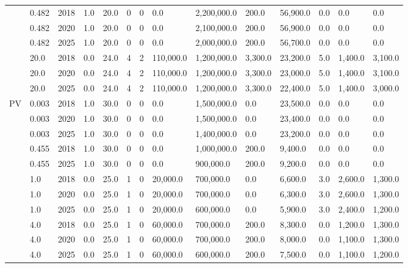 \begin{table*}[]
\begin{tabularx}{\linewidth}{|p{}|l|l|l|l|l|l|l|l|l|l|l|l|l|}
& 0.482 & 2018 & 1.0 & 20.0 & 0 & 0 & 0.0 & 2,200,000.0 & 200.0 & 56,900.0 & 0.0 & 0.0 & 0.0 \\ \cline{2-14} 
& 0.482 & 2020 & 1.0 & 20.0 & 0 & 0 & 0.0 & 2,100,000.0 & 200.0 & 56,900.0 & 0.0 & 0.0 & 0.0 \\ \cline{2-14} 
& 0.482 & 2025 & 1.0 & 20.0 & 0 & 0 & 0.0 & 2,000,000.0 & 200.0 & 56,700.0 & 0.0 & 0.0 & 0.0 \\ \cline{2-14} 
& 20.0 & 2018 & 0.0 & 24.0 & 4 & 2 & 110,000.0 & 1,200,000.0 & 3,300.0 & 23,200.0 & 5.0 & 1,400.0 & 3,100.0 \\ \cline{2-14} 
& 20.0 & 2020 & 0.0 & 24.0 & 4 & 2 & 110,000.0 & 1,200,000.0 & 3,300.0 & 23,000.0 & 5.0 & 1,400.0 & 3,100.0 \\ \cline{2-14} 
& 20.0 & 2025 & 0.0 & 24.0 & 4 & 2 & 110,000.0 & 1,200,000.0 & 3,300.0 & 22,400.0 & 5.0 & 1,400.0 & 3,000.0 \\ \hline
\multirow{14}{*}{PV} & 0.003 & 2018 & 1.0 & 30.0 & 0 & 0 & 0.0 & 1,500,000.0 & 0.0 & 23,500.0 & 0.0 & 0.0 & 0.0 \\ \cline{2-14} 
& 0.003 & 2020 & 1.0 & 30.0 & 0 & 0 & 0.0 & 1,500,000.0 & 0.0 & 23,400.0 & 0.0 & 0.0 & 0.0 \\ \cline{2-14} 
& 0.003 & 2025 & 1.0 & 30.0 & 0 & 0 & 0.0 & 1,400,000.0 & 0.0 & 23,200.0 & 0.0 & 0.0 & 0.0 \\ \cline{2-14} 
& 0.455 & 2018 & 1.0 & 30.0 & 0 & 0 & 0.0 & 1,000,000.0 & 200.0 & 9,400.0 & 0.0 & 0.0 & 0.0 \\ \cline{2-14} 
& 0.455 & 2025 & 1.0 & 30.0 & 0 & 0 & 0.0 & 900,000.0 & 200.0 & 9,200.0 & 0.0 & 0.0 & 0.0 \\ \cline{2-14} 
& 1.0 & 2018 & 0.0 & 25.0 & 1 & 0 & 20,000.0 & 700,000.0 & 0.0 & 6,600.0 & 3.0 & 2,600.0 & 1,300.0 \\ \cline{2-14} 
& 1.0 & 2020 & 0.0 & 25.0 & 1 & 0 & 20,000.0 & 700,000.0 & 0.0 & 6,300.0 & 3.0 & 2,600.0 & 1,300.0 \\ \cline{2-14} 
& 1.0 & 2025 & 0.0 & 25.0 & 1 & 0 & 20,000.0 & 600,000.0 & 0.0 & 5,900.0 & 3.0 & 2,400.0 & 1,200.0 \\ \cline{2-14} 
& 4.0 & 2018 & 0.0 & 25.0 & 1 & 0 & 60,000.0 & 700,000.0 & 200.0 & 8,300.0 & 0.0 & 1,200.0 & 1,300.0 \\ \cline{2-14} 
& 4.0 & 2020 & 0.0 & 25.0 & 1 & 0 & 60,000.0 & 700,000.0 & 200.0 & 8,000.0 & 0.0 & 1,100.0 & 1,300.0 \\ \cline{2-14} 
& 4.0 & 2025 & 0.0 & 25.0 & 1 & 0 & 60,000.0 & 600,000.0 & 200.0 & 7,500.0 & 0.0 & 1,100.0 & 1,200.0 \\ \cline{2-14} 

\end{tabularx}
\end{table*}
